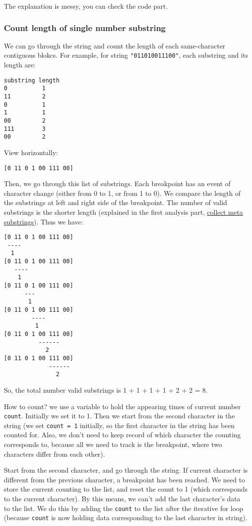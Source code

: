 \documentclass[12pt]{article}
\begin{document}
The explanation is messy, you can check the code part.
\subsubsection{Count length of single number substring}
\label{sec:orgc8ef6da}
We can go through the string and count the length of each same-character contiguous blokcs. For example, for string \texttt{"011010011100"}, each substring and its length are:
\begin{verbatim}
substring length
0          1
11         2
0          1
1          1
00         2
111        3
00         2
\end{verbatim}
View horizontally:
\begin{verbatim}
[0 11 0 1 00 111 00]
\end{verbatim}
Then, we go through this list of substrings. Each breakpoint has an event of character change (either from 0 to 1, or from 1 to 0). We compare the length of the substrings at left and right side of the breakpoint. The number of valid substrings is the shorter length (explained in the first analysis part, \hyperref[org197fbc5]{collect meta substrings}). Thus we have:
\begin{verbatim}
[0 11 0 1 00 111 00]
 ----
  1
[0 11 0 1 00 111 00]
   ----
    1
[0 11 0 1 00 111 00]
      ---
       1
[0 11 0 1 00 111 00]
        ----
         1
[0 11 0 1 00 111 00]
          ------
            2
[0 11 0 1 00 111 00]
             ------
               2
\end{verbatim}
So, the total number valid substrings is 1 + 1 + 1 + 1 + 2 + 2 = 8.

How to count? we use a variable to hold the appearing times of current number \texttt{count}. Initially we set it to 1. Then we start from the second character in the string (we set \texttt{count = 1} initially, so the first character in the string has been counted for. Also, we don't need to keep record of which character the counting corresponds to, because all we need to track is the breakpoint, where two characters differ from each other).

Start from the second character, and go through the string. If current character is different from the previous character, a breakpoint has been reached. We need to store the current counting to the list, and reset the count to 1 (which corresponds to the current character). By this means, we can't add the last character's data to the list. We do this by adding the \texttt{count} to the list after the iterative for loop (because \texttt{count} is now holding data corresponding to the last character in string).
\end{document}

